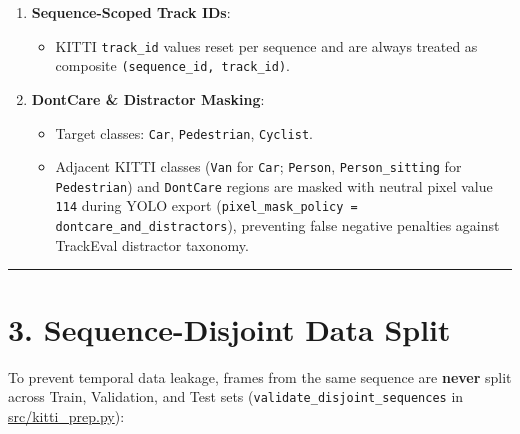 \documentclass[10.5pt,a4paper]{article}
\begin{document}
\begin{enumerate}[leftmargin=1.8em,itemsep=2pt]
\begin{itemize}[leftmargin=1.5em,itemsep=2pt]
\item Enforces 17 fields per row, finite numeric values, and \texttt{x2 > x1}, \texttt{y2 > y1}.
\end{itemize}
\item \textbf{Sequence-Scoped Track IDs}:
\begin{itemize}[leftmargin=1.5em,itemsep=2pt]
\item KITTI \texttt{track\_\allowbreak{}id} values reset per sequence and are always treated as composite \texttt{(sequence\_\allowbreak{}id,\allowbreak{} track\_\allowbreak{}id)}.
\end{itemize}
\item \textbf{DontCare \& Distractor Masking}:
\begin{itemize}[leftmargin=1.5em,itemsep=2pt]
\item Target classes: \texttt{Car}, \texttt{Pedestrian}, \texttt{Cyclist}.
\item Adjacent KITTI classes (\texttt{Van} for \texttt{Car}; \texttt{Person}, \texttt{Person\_\allowbreak{}sitting} for \texttt{Pedestrian}) and \texttt{DontCare} regions are masked with neutral pixel value \texttt{114} during YOLO export (\texttt{pixel\_\allowbreak{}mask\_\allowbreak{}policy = dontcare\_\allowbreak{}and\_\allowbreak{}distractors}), preventing false negative penalties against TrackEval distractor taxonomy.
\end{itemize}
\end{enumerate}

\par\noindent\rule{\textwidth}{0.4pt}\par\medskip

\section{3. Sequence-Disjoint Data Split}

To prevent temporal data leakage, frames from the same sequence are \textbf{never} split across Train, Validation, and Test sets (\texttt{validate\_\allowbreak{}disjoint\_\allowbreak{}sequences} in \href{https://github.com/Heisnotanimposter/Totalcare\_autonomous\_driving\_Yolov5/blob/main/src/kitti\_prep.py}{src/kitti\_prep.py}):
\end{document}
